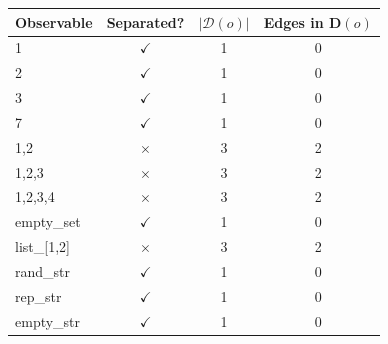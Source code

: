 \begin{tabular}{l c c c}
\toprule
\textbf{Observable} & \textbf{Separated?} & \(|\mathcal{D}(o)|\) & \textbf{Edges in \(\mathbf{D}(o)\)} \\
\midrule
  1 & $\checkmark$ & 1 & 0 \\
  2 & $\checkmark$ & 1 & 0 \\
  3 & $\checkmark$ & 1 & 0 \\
  7 & $\checkmark$ & 1 & 0 \\
  1,2 & $\times$ & 3 & 2 \\
  1,2,3 & $\times$ & 3 & 2 \\
  1,2,3,4 & $\times$ & 3 & 2 \\
  empty\_set & $\checkmark$ & 1 & 0 \\
  list\_[1,2] & $\times$ & 3 & 2 \\
  rand\_str & $\checkmark$ & 1 & 0 \\
  rep\_str & $\checkmark$ & 1 & 0 \\
  empty\_str & $\checkmark$ & 1 & 0 \\
\bottomrule
\end{tabular}